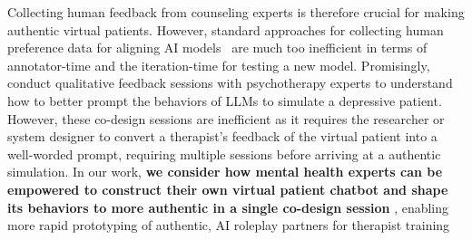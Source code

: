 Collecting human feedback from counseling experts is therefore crucial for making authentic virtual patients.  However, standard approaches for collecting human preference data for aligning AI models~\cite{christiano2017deep, rafailov2024direct} are much too inefficient in terms of annotator-time and the iteration-time for testing a new model. 
Promisingly,~\citet{chen2023llmempowered} conduct qualitative feedback sessions with psychotherapy experts to understand how to better prompt the behaviors of LLMs to simulate a depressive patient. However, these co-design sessions are inefficient as it requires the researcher or system designer to convert a therapist's feedback of the virtual patient into a well-worded prompt, requiring multiple sessions before arriving at a authentic   simulation.
In our work, \textbf{we consider how mental health experts can be empowered to construct their own virtual patient chatbot and shape its behaviors to more authentic in a single co-design session} , enabling more rapid prototyping of authentic, AI roleplay partners for therapist training 

